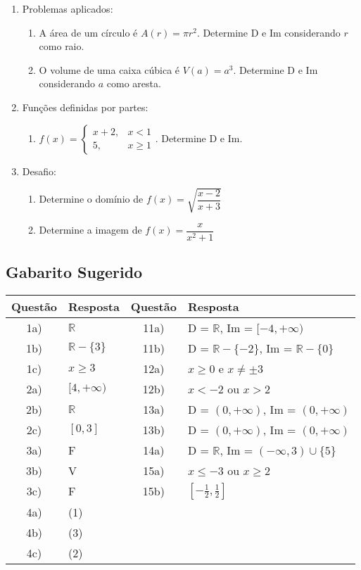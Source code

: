 \documentclass[11pt]{article}
\begin{document}
\begin{multicols}{2}
\begin{enumerate}
    \item Problemas aplicados:
    \begin{enumerate}[label=\alph*)]
        \item A área de um círculo é $A(r) = \pi r^2$. Determine D e Im considerando $r$ como raio.
        \item O volume de uma caixa cúbica é $V(a) = a^3$. Determine D e Im considerando $a$ como aresta.
    \end{enumerate}
    
    \item Funções definidas por partes:
    \begin{enumerate}[label=\alph*)]
        \item $f(x) = \begin{cases} x+2, & x < 1 \\ 5, & x \geq 1 \end{cases}$. Determine D e Im.
    \end{enumerate}
    
    \item Desafio:
    \begin{enumerate}[label=\alph*)]
        \item Determine o domínio de $f(x) = \sqrt{\dfrac{x-2}{x+3}}$
        \item Determine a imagem de $f(x) = \dfrac{x}{x^2+1}$
    \end{enumerate}
\end{enumerate}

\subsection*{Gabarito Sugerido}
\begin{tabular}{|c|l|c|l|}
\hline
\textbf{Questão} & \textbf{Resposta} & \textbf{Questão} & \textbf{Resposta} \\
\hline
1a) & $\mathbb{R}$ & 11a) & D = $\mathbb{R}$, Im = $[-4,+\infty)$ \\
1b) & $\mathbb{R} - \{3\}$ & 11b) & D = $\mathbb{R} - \{-2\}$, Im = $\mathbb{R} - \{0\}$ \\
1c) & $x \geq 3$ & 12a) & $x \geq 0$ e $x \neq \pm 3$ \\
2a) & $[4,+\infty)$ & 12b) & $x < -2$ ou $x > 2$ \\
2b) & $\mathbb{R}$ & 13a) & D = $(0,+\infty)$, Im = $(0,+\infty)$ \\
2c) & $[0,3]$ & 13b) & D = $(0,+\infty)$, Im = $(0,+\infty)$ \\
3a) & F & 14a) & D = $\mathbb{R}$, Im = $(-\infty,3) \cup \{5\}$ \\
3b) & V & 15a) & $x \leq -3$ ou $x \geq 2$ \\
3c) & F & 15b) & $[-\frac{1}{2},\frac{1}{2}]$ \\
4a) & (1) & & \\
4b) & (3) & & \\
4c) & (2) & & \\
\hline
\end{tabular}

\end{multicols}
\end{document}
